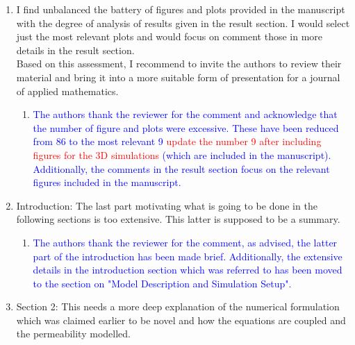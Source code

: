 \documentclass[11pt]{letter} %
\newcommand{\red}{\textcolor{red}}
\newcommand{\blue}{\textcolor{blue}}
\begin{document}
\begin{letter}
{\begin{enumerate}
\begin{enumerate}
   \begin{enumerate}
      \item \label{R_R2_TooDesc_1} \blue{The authors thank the reviewer for the comment. The Abstract, Introduction and Section 3 has been amended and clarity has been provided regarding the issue of novelty as discussed in the response at \ref{R_R1_Novelty} and \ref{R_R2_Novelty_1}}
        \end{enumerate}
      \item \label{R_R2_TooMuchFig} I find unbalanced the battery of figures and plots provided in the manuscript with the degree of analysis of results given in the result section. I would select just the most relevant plots and would focus on comment those in more details in the result section.\\
        Based on this assessment, I recommend to invite the authors to review their material and bring it into a more suitable form of presentation for a journal of applied mathematics.
         \begin{enumerate}
      \item \label{R_R2_TooMuchFig_1} \blue{The authors thank the reviewer for the comment and acknowledge that the number of figure and plots were excessive. These have been reduced from 86 to the most relevant 9 \red{update the number 9 after including figures for the 3D simulations} (which are included in the manuscript). Additionally, the comments in the result section focus on the relevant figures included in the manuscript.}
        \end{enumerate}
\item \label{R_R2_TooMuchSum} Introduction: The last part motivating what is going to be done in the following sections is too extensive. This latter is supposed to be a summary.
   \begin{enumerate}
      \item \label{R_R2_TooMuchSum_1} \blue{The authors thank the reviewer for the comment, as advised, the latter part of the introduction has been made brief. Additionally, the extensive details in the introduction section which was referred to has been moved to the section on "Model Description and Simulation Setup".}
        \end{enumerate}
\item \label{R_R2_NumFormulation} Section 2: This needs a more deep explanation of the numerical formulation which was claimed earlier to be novel and how the equations are coupled and the permeability modelled.
   \begin{enumerate}

\end{enumerate}
\end{enumerate}
\end{enumerate}}
\end{letter}
\end{document}
